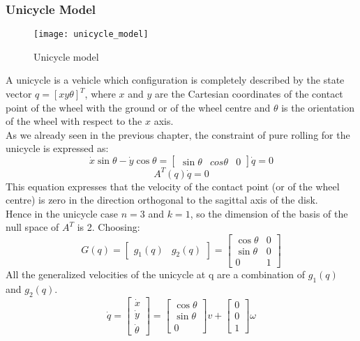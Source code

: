\subsubsection{Unicycle Model}
\begin{figure}[h!]
	\centering
	\texttt{[image: unicycle\_model]}
	\caption{Unicycle model}
\end{figure}
A unicycle is a vehicle which configuration is completely described by the state vector $q = [x y \theta]^T$, where $x$ and $y$ are the Cartesian coordinates of the contact point of the wheel with the ground or of the wheel centre and $\theta$ is the orientation of the wheel with respect to the $x$ axis. \\
As we already seen in the previous chapter, the constraint of pure rolling for the unicycle is expressed as:
\begin{equation} 
\dot{x}\sin\theta-\dot{y}\cos\theta=\left[
\begin{matrix}
\sin\theta & cos\theta & 0
\end{matrix}
\right] \dot{q}=0
\end{equation}
\begin{equation*} \label{At}
A^T \left( q \right)\dot{q} =0  
\end{equation*}
This equation expresses that the velocity of the contact point (or of the wheel centre) is zero in the direction orthogonal to the sagittal axis of the disk.\\
Hence in the unicycle case $n=3$ and $k=1$, so the dimension of the basis of the null space of $A^T$ is 2. Choosing:
\begin{equation} 
G(q)=\left[
\begin{matrix}
g_1 (q) & g_2 (q)
\end{matrix}
\right] =  \left[
\begin{matrix}
\cos\theta & 0 \\
\sin\theta & 0 \\
0 & 1 
\end{matrix}
\right]
\end{equation}
All the generalized velocities of the unicycle at q are a combination of $g_1 (q)$ and $g_2 (q)$.
\begin{equation} 
\dot{q}=\left[
\begin{matrix}
\dot{x} \\ \dot{y} \\\dot{\theta}
\end{matrix}
\right] =  \left[
\begin{matrix}
\cos\theta \\ \sin\theta \\ 0 
\end{matrix}
\right]v + \left[
\begin{matrix}
0 \\ 0 \\ 1 
\end{matrix}
\right]\omega
\end{equation}
